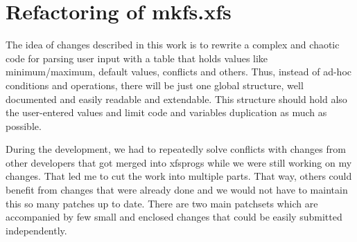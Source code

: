 
\chapter{Refactoring of mkfs.xfs} \label{chap:refactoring}

The idea of changes described in this work is to rewrite a complex and
chaotic code for parsing user input with a table that holds values like
minimum/maximum, default values, conflicts and others. Thus, instead of
ad-hoc conditions and operations, there will be just one global structure,
well documented and easily readable and extendable. This structure should
hold also the user-entered values and limit code and variables duplication
as much as possible.

During the development, we had to repeatedly solve conflicts with changes
from other developers that got merged into xfsprogs while we were still
working on my changes. That led me to cut the work into multiple parts.
That way, others could benefit from changes that were already done and we
would not have to maintain this so many patches up to date. There are two
main patchsets which are accompanied by few small and enclosed changes that
could be easily submitted independently.

